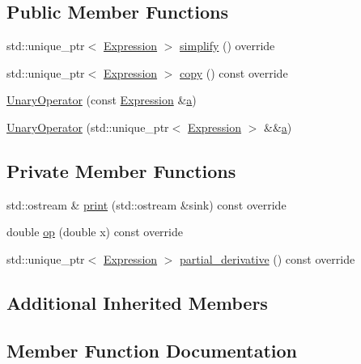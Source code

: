 \subsection*{Public Member Functions}
\begin{DoxyCompactItemize}
\item 
std\+::unique\+\_\+ptr$<$ \mbox{\hyperlink{classsymcpp_1_1Expression}{Expression}} $>$ \mbox{\hyperlink{classsymcpp_1_1Sine_a3cac7091905da6765a019a0ece9e45d5}{simplify}} () override
\item 
std\+::unique\+\_\+ptr$<$ \mbox{\hyperlink{classsymcpp_1_1Expression}{Expression}} $>$ \mbox{\hyperlink{classsymcpp_1_1Sine_aab90ccee3ae1fd2d832bdf041e8352c6}{copy}} () const override
\item 
\mbox{\hyperlink{classsymcpp_1_1Sine_a23a8172db96675ebf1114f4f3f41b6f1}{Unary\+Operator}} (const \mbox{\hyperlink{classsymcpp_1_1Expression}{Expression}} \&\mbox{\hyperlink{classsymcpp_1_1UnaryOperator_a1558842963261562d2ef68e324822cba}{a}})
\item 
\mbox{\hyperlink{classsymcpp_1_1Sine_ad3aa899567a080eeb41cb850de310178}{Unary\+Operator}} (std\+::unique\+\_\+ptr$<$ \mbox{\hyperlink{classsymcpp_1_1Expression}{Expression}} $>$ \&\&\mbox{\hyperlink{classsymcpp_1_1UnaryOperator_a1558842963261562d2ef68e324822cba}{a}})
\end{DoxyCompactItemize}
\subsection*{Private Member Functions}
\begin{DoxyCompactItemize}
\item 
std\+::ostream \& \mbox{\hyperlink{classsymcpp_1_1Sine_ad3680056460c4990115a23427ea723fe}{print}} (std\+::ostream \&sink) const override
\item 
double \mbox{\hyperlink{classsymcpp_1_1Sine_afb302fcff7d0a5e528f8fe5a2d111666}{op}} (double x) const override
\item 
std\+::unique\+\_\+ptr$<$ \mbox{\hyperlink{classsymcpp_1_1Expression}{Expression}} $>$ \mbox{\hyperlink{classsymcpp_1_1Sine_ac7978c7094ce614049521c4d9cfd0827}{partial\+\_\+derivative}} () const override
\end{DoxyCompactItemize}
\subsection*{Additional Inherited Members}


\subsection{Member Function Documentation}
\mbox{\label{classsymcpp_1_1Sine_aab90ccee3ae1fd2d832bdf041e8352c6}} 
